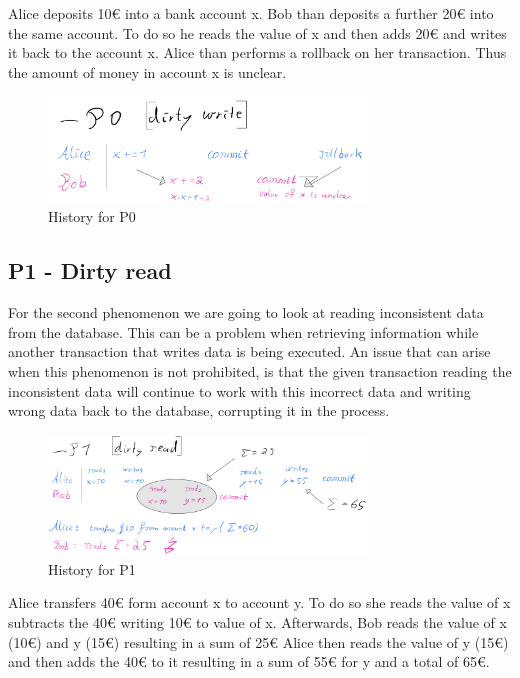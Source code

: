 \documentclass[sigconf, review=false]{acmart}
\begin{document}
\begin{example}
    Alice deposits 10€ into a bank account x.
    Bob than deposits a further 20€ into the same account.
    To do so he reads the value of x and then adds 20€ and writes it back to the account x.
    Alice than performs a rollback on her transaction.
    Thus the amount of money in account x is unclear.
\end{example}

\begin{figure}[h]
    \includegraphics[width=8.5cm]{P0}
    \caption{History for P0}
\end{figure}

\subsection{P1 - Dirty read}
For the second phenomenon we are going to look at reading inconsistent data from the database.
This can be a problem when retrieving information while another transaction
that writes data is being executed. An issue that can arise when this phenomenon is not prohibited,
is that the given transaction reading the inconsistent data will continue to work with this
incorrect data and writing wrong data back to the database, corrupting it in the process.

\begin{figure}[h]
    \includegraphics[width=8.5cm]{P1}
    \caption{History for P1}
\end{figure}

\begin{example}
    Alice transfers 40€ form account x to account y.
    To do so she reads the value of x subtracts the 40€ writing 10€ to value of x.
    Afterwards, Bob reads the value of x (10€) and y (15€) resulting in a sum of 25€
    Alice then reads the value of y (15€) and then adds the 40€ to it resulting in a sum of 55€ for y
    and a total of 65€.
\end{example}
\end{document}
